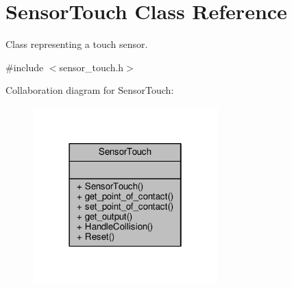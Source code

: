 \hypertarget{classSensorTouch}{}\section{Sensor\+Touch Class Reference}
\label{classSensorTouch}


Class representing a touch sensor.  




{\ttfamily \#include $<$sensor\+\_\+touch.\+h$>$}



Collaboration diagram for Sensor\+Touch\+:\nopagebreak
\begin{figure}[H]
\begin{center}
\leavevmode
\includegraphics[width=202pt]{classSensorTouch__coll__graph}
\end{center}
\end{figure}
